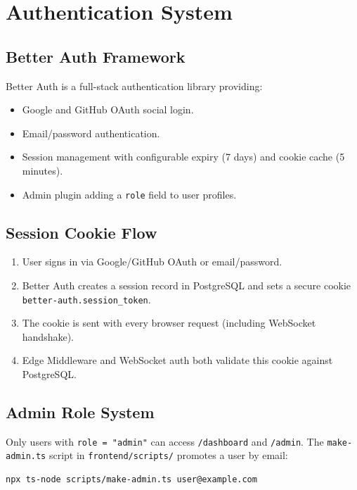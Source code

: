 \documentclass[12pt, a4paper]{report}
\begin{document}
\chapter{Authentication System}

\section{Better Auth Framework}

Better Auth is a full-stack authentication library providing:
\begin{itemize}
    \item Google and GitHub OAuth social login.
    \item Email/password authentication.
    \item Session management with configurable expiry (7 days) and cookie cache
          (5 minutes).
    \item Admin plugin adding a \texttt{role} field to user profiles.
\end{itemize}

\section{Session Cookie Flow}

\begin{enumerate}
    \item User signs in via Google/GitHub OAuth or email/password.
    \item Better Auth creates a session record in PostgreSQL and sets a secure
          cookie \texttt{better-auth.session\_token}.
    \item The cookie is sent with every browser request (including WebSocket
          handshake).
    \item Edge Middleware and WebSocket auth both validate this cookie against
          PostgreSQL.
\end{enumerate}

\section{Admin Role System}

Only users with \texttt{role = "admin"} can access \texttt{/dashboard} and
\texttt{/admin}. The \texttt{make-admin.ts} script in
\texttt{frontend/scripts/} promotes a user by email:

\begin{verbatim}
npx ts-node scripts/make-admin.ts user@example.com
\end{verbatim}
\end{document}

